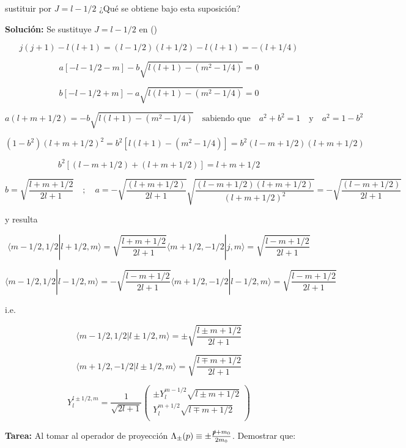 \documentclass{report}
\begin{document}
sustituir por $J = l-1/2$ ¿Qué se obtiene bajo esta suposición?

\textbf{Solución:} Se sustituye $J = l-1/2$ en ()

\[j(j+1) - l(l+1) = (l-1/2)(l+1/2)-l(l+1) = - (l+1/4)\]

\[a[-l-1/2-m]-b \sqrt{l(l+1)-(m^2 - 1/4)} = 0 \]

\[b[-l-1/2+m]-a \sqrt{l(l+1)-(m^2 - 1/4)} = 0 \]

\[a(l+m+1/2) = -b \sqrt{l(l+1)-(m^2-1/4)} \quad \text{sabiendo que} \quad a^2 + b^2 = 1 \quad \text{y} \quad a^2 = 1-b^2\]

\[(1-b^2)(l+m+1/2)^2 = b^2 [l(l+1)-(m^2-1/4)]=b^2(l-m+1/2)(l+m+1/2)\]

\[b^2 [(l-m+1/2)+(l+m+1/2)] = l + m +1/2\]

\begin{equation}
b = \sqrt{\frac{l+m+1/2}{2l+1}} \quad ; \quad a = - \sqrt{\frac{(l+m+1/2)}{2l+1}} \sqrt{\frac{(l-m+1/2)(l+m+1/2)}{(l+m+1/2)^2} } = - \sqrt{\frac{(l-m+1/2)}{2l+1}}
\end{equation}

y resulta

\begin{equation}
\langle m - 1/2 , 1/2 |l+1/2,m\rangle = \sqrt{\frac{l+m+1/2}{2l+1}} \langle m +1/2 , -1/2 | j,m \rangle = \sqrt{\frac{l-m+1/2}{2l+1}}
\end{equation}

\begin{equation}
\langle m - 1/2 , 1/2 |l-1/2,m\rangle = - \sqrt{\frac{l-m+1/2}{2l+1}} \langle m +1/2 , -1/2 | l-1/2 ,m \rangle = \sqrt{\frac{l-m+1/2}{2l+1}}
\end{equation}

i.e.

\[ \langle m -1/2 , 1/2 | l\pm 1/2 ,m \rangle = \pm \sqrt{\frac{l \pm m+1/2}{2l+1}} \]

\[ \langle m + 1/2 , - 1/2 | l\pm 1/2 ,m \rangle =  \sqrt{\frac{l \mp m+1/2}{2l+1}} \]

\[Y_{l}^{l \pm 1/2 , m} = \frac{1}{\sqrt{2l+1}}  \left ( \begin{array}{cc}
 \pm Y_{l}^{m-1/2} \sqrt{l \pm m +1/2}   \\
 Y_{l}^{m + 1/2} \sqrt{l \mp m +1/2}    \\
 \end{array} \right) \]

\textbf{Tarea:} Al tomar al operador de proyección $\Lambda _{\pm} (p) \equiv \pm \frac{\slashed{p} + m_0}{2m_0 }$. Demostrar que:
\end{document}
